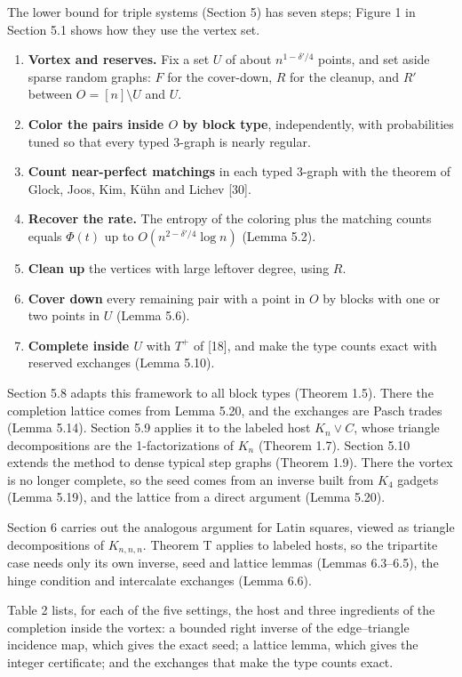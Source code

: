 \documentclass[english,11pt,a4paper]{article}
\providecommand{\tightlist}{\setlength{\itemsep}{0pt}\setlength{\parskip}{0pt}}
\begin{document}
The lower bound for triple systems (Section 5) has seven steps; Figure 1 in Section 5.1 shows how they use the vertex set.

\begin{enumerate}
\def\labelenumi{\arabic{enumi}.}
\tightlist
\item
  \textbf{Vortex and reserves.} Fix a set \(U\) of about \(n^{1-\delta'/4}\) points, and set aside sparse random graphs: \(F\) for the cover-down, \(R\) for the cleanup, and \(R'\) between \(O=[n]\setminus U\) and \(U\).
\item
  \textbf{Color the pairs inside \(O\) by block type}, independently, with probabilities tuned so that every typed 3-graph is nearly regular.
\item
  \textbf{Count near-perfect matchings} in each typed 3-graph with the theorem of Glock, Joos, Kim, Kühn and Lichev {[}30{]}.
\item
  \textbf{Recover the rate.} The entropy of the coloring plus the matching counts equals \(\Phi(t)\) up to \(O(n^{2-\delta'/4}\log n)\) (Lemma 5.2).
\item
  \textbf{Clean up} the vertices with large leftover degree, using \(R\).
\item
  \textbf{Cover down} every remaining pair with a point in \(O\) by blocks with one or two points in \(U\) (Lemma 5.6).
\item
  \textbf{Complete inside \(U\)} with \(T^+\) of {[}18{]}, and make the type counts exact with reserved exchanges (Lemma 5.10).
\end{enumerate}

Section 5.8 adapts this framework to all block types (Theorem 1.5). There the completion lattice comes from Lemma 5.20, and the exchanges are Pasch trades (Lemma 5.14). Section 5.9 applies it to the labeled host \(K_n\vee C\), whose triangle decompositions are the 1-factorizations of \(K_n\) (Theorem 1.7). Section 5.10 extends the method to dense typical step graphs (Theorem 1.9). There the vortex is no longer complete, so the seed comes from an inverse built from \(K_4\) gadgets (Lemma 5.19), and the lattice from a direct argument (Lemma 5.20).

Section 6 carries out the analogous argument for Latin squares, viewed as triangle decompositions of \(K_{n,n,n}\). Theorem T applies to labeled hosts, so the tripartite case needs only its own inverse, seed and lattice lemmas (Lemmas 6.3--6.5), the hinge condition and intercalate exchanges (Lemma 6.6).

Table 2 lists, for each of the five settings, the host and three ingredients of the completion inside the vortex: a bounded right inverse of the edge--triangle incidence map, which gives the exact seed; a lattice lemma, which gives the integer certificate; and the exchanges that make the type counts exact.
\end{document}
